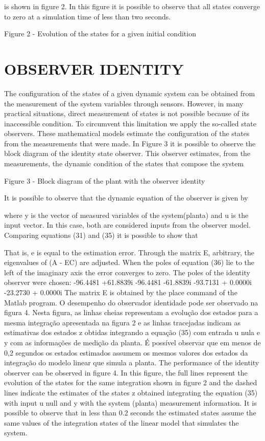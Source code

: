 \documentclass[sublist,a4paper,twoside,11pt]{article}
\begin{document}
is shown in figure 2. In this figure it is possible to observe that all states converge to zero at a simulation time of less than two seconds.

Figure 2 - Evolution of the states for a given initial condition

\section{OBSERVER IDENTITY}
The configuration of the states of a given dynamic system can be obtained from the measurement of the system variables through sensors. However, in many practical situations, direct measurement of states is not possible because of its inaccessible condition. To circumvent this limitation we apply the so-called state observers. These mathematical models estimate the configuration of the states from the measurements that were made. In Figure 3 it is possible to observe the block diagram of the identity state observer. This observer estimates, from the measurements, the dynamic condition of the states that compose the system 

Figure 3 - Block diagram of the plant with the observer identity

It is possible to observe that the dynamic equation of the observer is given by

where y is the vector of measured variables of the system(planta) and u is the input vector. In this case, both are considered inputs from the observer model.
Comparing equations (31) and (35) it is possible to show that


That is, e is equal to the estimation error. Through the matrix E, arbitrary, the eigenvalues of (A - EC) are adjusted. When the poles of equation (36) lie to the left of the imaginary axis the error converges to zero. The poles of the identity observer were chosen:
-96.4481 +61.8839i
-96.4481 -61.8839i
-93.7131 + 0.0000i
-23.2730 + 0.0000i
The matrix E is obtained by the place command of the Matlab program.
O desempenho do observador identidade pode ser observado na figura 4. Nesta figura, as linhas cheias representam a evolução dos estados para a mesma integração apresentada na  figura 2 e as linhas tracejadas indicam as estimativas dos estados z obtidas integrando a equação (35) com entrada u nula e y com as informações de medição da planta. É possível observar que em menos de 0,2 segundos os estados estimados assumem os mesmos valores dos estados da integração do modelo linear que simula a planta.	The performance of the identity observer can be observed in figure 4. In this figure, the full lines represent the evolution of the states for the same integration shown in figure 2 and the dashed lines indicate the estimates of the states z obtained integrating the equation (35) with input u null and y with the system (planta) measurement information. It is possible to observe that in less than 0.2 seconds the estimated states assume the same values of the integration states of the linear model that simulates the system.
\end{document}
